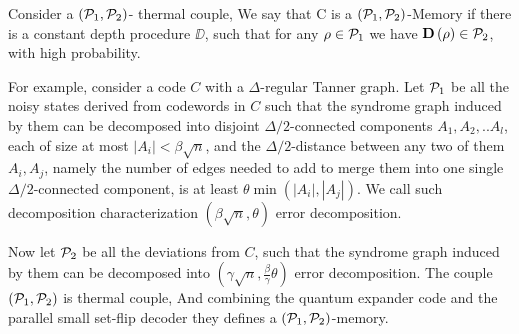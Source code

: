 \documentclass[manuscript,screen,review]{acmart}
\begin{document}
{ \begin{definition}[$(\Po,\Pt)$-Memory]
   Consider a $\left(\mathcal{P}_{1},\mathcal{P}_{2} \right)$- thermal couple, We say that C is a $(\Po, \Pt)$-Memory if there is a constant depth procedure $\DD$, such that for any $\rho \in \mathcal{P}_{1}$ we have $\mathbf{D}\left( \rho \right) \in \mathcal{P}_{2}$, with high probability. 
 \end{definition}
 For example, consider a code $C$ with a $\Delta$-regular Tanner graph. Let $\mathcal{P}_{1}$ be all the noisy states derived from codewords in $C$ such that the syndrome graph induced by them can be decomposed into disjoint $\Delta/2$-connected components $A_{1},A_{2},..A_{l}$, each of size at most $|A_{i}| < \beta \sqrt{n}$, and the $\Delta/2$-distance between any two of them $A_{i}, A_{j}$, namely the number of edges needed to add to merge them into one single $\Delta/2$-connected component, is at least $\theta \min \left( |A_{i}|, |A_{j}| \right)$. We call such decomposition characterization $(\beta \sqrt{n}, \theta )$ error decomposition. 

 Now let $\mathcal{P}_{2}$ be all the deviations from $C$, such that the syndrome graph induced by them can be decomposed into $(\gamma \sqrt{n}, \frac{\beta}{\gamma}  \theta )$ error decomposition. The couple $\left( \mathcal{P}_{1}, \mathcal{P}_{2} \right)$ is thermal couple, And combining the quantum expander code and the parallel small set-flip decoder \cite{grospellier:tel-03364419} they defines a $\left( \mathcal{P}_{1}, \mathcal{P}_{2} \right)$-memory. 










  \newcommand{\sliceb}[1]{ \slice[style=blue, label style={inner sep=1pt,anchor=south west,rotate=40}]{#1}}

}
\end{document}
